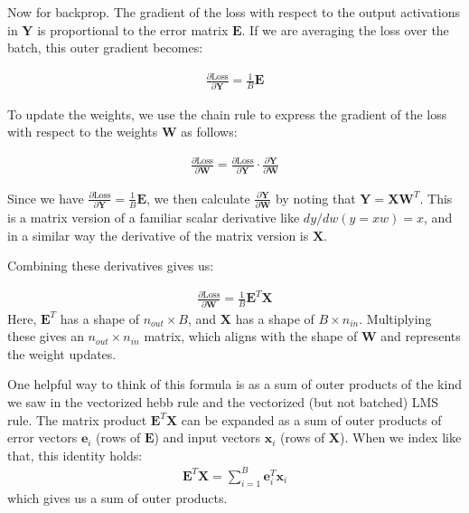 Now for backprop. The gradient of the loss with respect to the output activations in $\mathbf{Y}$ is proportional to the error matrix $\mathbf{E}$. If we are averaging the loss over the batch, this outer gradient becomes:

\begin{eqnarray}
\frac{\partial \text{Loss}}{\partial \mathbf{Y}} = \frac{1}{B} \mathbf{E}
\end{eqnarray}

To update the weights, we use the chain rule to express the gradient of the loss with respect to the weights $\mathbf{W}$ as follows:

\begin{eqnarray}
\frac{\partial \text{Loss}}{\partial \mathbf{W}} = \frac{\partial \text{Loss}}{\partial \mathbf{Y}} \cdot \frac{\partial \mathbf{Y}}{\partial \mathbf{W}}
\end{eqnarray}

Since we have $\frac{\partial \text{Loss}}{\partial \mathbf{Y}} = \frac{1}{B} \mathbf{E}$, we then calculate $\frac{\partial \mathbf{Y}}{\partial \mathbf{W}}$ by noting that $\mathbf{Y} = \mathbf{X} \mathbf{W}^T$. This is a matrix version of a familiar scalar derivative like $dy/dw(y = xw) = x$, and in a similar way the derivative of the matrix version is $\mathbf{X}$. 

Combining these derivatives gives us:

\begin{eqnarray}
\frac{\partial \text{Loss}}{\partial \mathbf{W}} = \frac{1}{B} \mathbf{E}^T \mathbf{X}
\end{eqnarray}
Here, $\mathbf{E}^T$ has a shape of $n_{out} \times B$, and $\mathbf{X}$ has a shape of $B \times n_{in}$. Multiplying these gives an $n_{out} \times n_{in}$ matrix, which aligns with the shape of $\mathbf{W}$ and represents the weight updates.

One helpful way to think of this formula is as a sum of outer products of the kind we saw in the vectorized hebb rule and the vectorized (but not batched) LMS rule. The matrix product $\mathbf{E}^T \mathbf{X}$ can be expanded as a sum of outer products of error vectors $\mathbf{e}_i$ (rows of $\mathbf{E}$) and input vectors $\mathbf{x}_i$ (rows of $\mathbf{X}$). When we index like that, this identity holds:
\begin{eqnarray}
\mathbf{E}^T \mathbf{X} = \sum_{i=1}^{B} \mathbf{e}_i^T \mathbf{x}_i
\end{eqnarray}
which gives us a sum of outer products.

